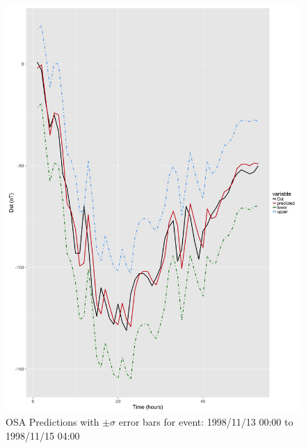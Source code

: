 \documentclass[sw, draft]{AGUTeX}
\begin{document}
\begin{figure}
\noindent\includegraphics[width=\textwidth]{PredictionsModel1/PredErrBars_Storm8.png}
\caption{OSA Predictions with $\pm \sigma$ error bars for event: 1998/11/13 00:00 to 1998/11/15 04:00}
\label{fig:ComparePred2}
\end{figure}
\end{document}
